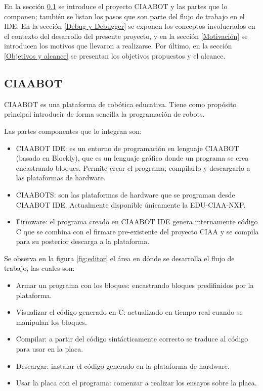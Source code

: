 En la sección \ref{CIAABOT} se introduce el proyecto CIAABOT y las partes que lo componen; también se listan los pasos que son parte del flujo de trabajo en el IDE.
En la sección \ref{Debug y Debugger} se exponen los conceptos involucrados en el contexto del desarrollo del presente proyecto, y en la sección \ref{Motivación} se introducen los motivos que llevaron a realizarse. Por último, en la sección \ref{Objetivos y alcance} se presentan los objetivos propuestos y el alcance.


\subsection{CIAABOT}
\label{CIAABOT}

CIAABOT es una plataforma de robótica educativa. Tiene como propósito principal introducir
de forma sencilla la programación de robots.

Las partes componentes que lo integran son:

\begin{itemize}
	\item CIAABOT IDE: es un entorno de programación en lenguaje CIAABOT (basado en  Blockly\citep{blockly}), que es un lenguaje gráfico donde un programa se crea encastrando bloques. Permite crear el programa, compilarlo y descargarlo a las plataformas de hardware.
	\item CIAABOTS: son las plataformas de hardware que se programan desde CIAABOT IDE. Actualmente disponible únicamente la EDU-CIAA-NXP.
	\item Firmware: el programa creado en CIAABOT IDE genera internamente código C que se combina con el firmare pre-existente del proyecto CIAA y se compila para su posterior descarga a la plataforma.
\end{itemize}

Se observa en la figura \ref{fig:editor} el área en dónde se desarrolla el flujo de trabajo, las cuales son:

\begin{itemize}
	\item Armar un programa con los bloques: encastrando bloques predifinidos por
	la plataforma.	
	\item Visualizar el código generado en C: actualizado en tiempo real cuando se
	manipulan los bloques.
	\item Compilar: a partir del código sintácticamente correcto se traduce al código
	para usar en la placa.
	\item Descargar: instalar el código generado en la plataforma de hardware.
	\item Usar la placa con el programa: comenzar a realizar los ensayos sobre la placa.
\end{itemize}


